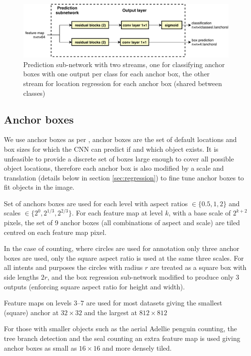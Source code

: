 \begin{figure}
  \centering
  \includegraphics[width=1.0\linewidth]{figures/annotation/prediction_subnet.pdf}
  \caption{Prediction sub-network with two streams, one for classifying anchor boxes with one output per class for each anchor box, the other stream for location regression for each anchor box (shared between classes)}    
  \label{fig:prediction_subnet}  
\end{figure}


\subsection{Anchor boxes}

We use anchor boxes as per \cite{Wang2017}, anchor boxes are the set of default locations and box sizes for which the \gls{CNN} can predict if and which object exists. It is unfeasible to provide a discrete set of boxes large enough to cover all possible object locations, therefore each anchor box is also modified by a scale and translation (details below in section \ref{sec:regression}) to fine tune anchor boxes to fit objects in the image.

Set of anchors boxes are used for each level with aspect ratios $ \in \{0.5, 1, 2\} $ and scales $ \in \{2^0, 2^{1/3}, 2^{2/3}\} $. For each feature map at level $k$, with a base scale of $ 2^{k + 2} $ pixels, the set of 9 anchor boxes (all combinations of aspect and scale) are tiled centred on each feature map pixel. 

In the case of counting, where circles are used for annotation only three anchor boxes are used, only the square aspect ratio is used at the same three scales. For all intents and purposes the circles with radius $r$ are treated as a square box with side lengths $2r$, and the box regression sub-network modified to produce only $3$ outputs (enforcing square aspect ratio for height and width).

Feature maps on levels $3$--$7$ are used for most datasets giving the smallest (square) anchor at $32\times32$ and the largest at $812\times812$ 

For those with smaller objects such as the aerial Adellie penguin counting, the tree branch detection and the seal counting an extra feature map is used giving anchor boxes as small as $16\times16$ and more densely tiled.

